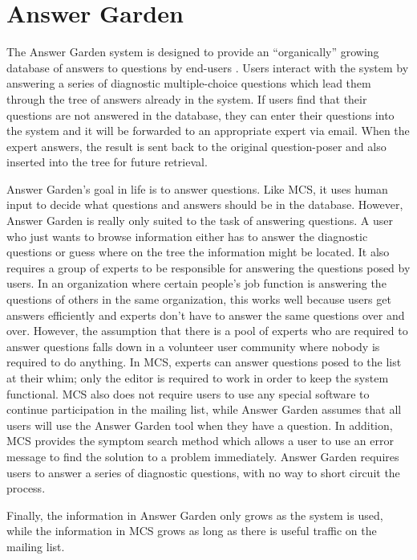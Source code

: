\section{Answer Garden}
\label{sec:answer-garden}
The Answer Garden system is designed to provide an ``organically'' growing
database of answers to questions by end-users \cite{Ackerman90}. Users interact
with the system by answering a series of diagnostic multiple-choice questions
which lead them through the tree of answers already in the system. If users
find that their questions are not answered in the database, they can enter
their questions into the system and it will be forwarded to an appropriate
expert via email. When the expert answers, the result is sent back to the
original question-poser and also inserted into the tree for future retrieval.

Answer Garden's goal in life is to answer questions. Like MCS, it uses human
input to decide what questions and answers should be in the database. However,
Answer Garden is really only suited to the task of answering questions. A user
who just wants to browse information either has to answer the diagnostic
questions or guess where on the tree the information might be located. It also
requires a group of experts to be responsible for answering the questions posed
by users. In an organization where certain people's job function is answering
the questions of others in the same organization, this works well because users
get answers efficiently and experts don't have to answer the same questions
over and over. However, the assumption that there is a pool of experts who are
required to answer questions falls down in a volunteer user community where
nobody is required to do anything. In MCS, experts can answer questions posed
to the list at their whim; only the editor is required to work in order to keep
the system functional. MCS also does not require users to use any special
software to continue participation in the mailing list, while Answer Garden
assumes that all users will use the Answer Garden tool when they have a
question. In addition, MCS provides the symptom search method which allows a
user to use an error message to find the solution to a problem immediately.
Answer Garden requires users to answer a series of diagnostic questions, with
no way to short circuit the process.

Finally, the information in Answer Garden only grows as the system is 
used, while the information in MCS grows as long as there is useful traffic on
the mailing list.

